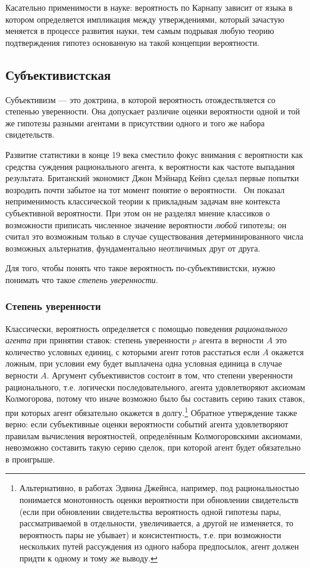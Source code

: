 \documentclass[14pt, a4paper, pdftex]{extarticle}
\begin{document}
Касательно применимости в науке: вероятность по Карнапу зависит от языка в котором определяется импликация между утверждениями, который зачастую меняется в процессе развития науки, тем самым подрывая любую теорию подтверждения гипотез основанную на такой концепции вероятности.

\subsection{Субъективистская}

Субъективизм --- это доктрина, в которой вероятность отождествляется со степенью уверенности. Она допускает различие оценки вероятности одной и той же гипотезы разными агентами в присутствии одного и того же набора свидетельств. 

Развитие статистики в конце 19 века сместило фокус внимания с вероятности как средства суждения рационального агента, к вероятности как частоте выпадания результата. Британский экономист Джон Мэйнард Кейнз сделал первые попытки возродить почти забытое на тот момент понятие о вероятности.~\cite{Keynes} Он показал неприменимость классической теории к прикладным задачам вне контекста субъективной вероятности. При этом он не разделял мнение классиков о возможности приписать численное значение вероятности \emph{любой} гипотезы; он считал это возможным только в случае существования детерминированного числа возможных альтернатив, фундаментально неотличимых друг от друга.~\cite[стр. 5]{Carnap}

Для того, чтобы понять что такое вероятность по-субъективистски, нужно понимать что такое \emph{степень уверенности}.

\subsubsection{Степень уверенности}

Классически, вероятность определяется с помощью поведения \emph{рационального агента} при принятии ставок: степень уверенности $p$ агента в верности $A$ это количество условных единиц, с которыми агент готов расстаться если $A$ окажется ложным, при условии ему будет выплачена одна условная единица в случае верности $A$. Аргумент субъективистов состоит в том, что степени уверенности рационального, т.е. логически последовательного, агента удовлетворяют аксиомам Колмогорова, потому что иначе возможно было бы составить серию таких ставок, при которых агент обязательно окажется в долгу.\footnote{
	Альтернативно, в работах Эдвина Джейнса, например, под рациональностью понимается монотонность оценки вероятности при обновлении свидетельств (если при обновлении свидетельства вероятность одной гипотезы пары, рассматриваемой в отдельности, увеличивается, а другой не изменяется, то вероятность пары не убывает) и консистентность, т.е. при возможности нескольких путей рассуждения из одного набора предпосылок, агент должен придти к одному и тому же выводу.
} 
Обратное утверждение также верно: если субъективные оценки вероятности событий агента удовлетворяют правилам вычисления вероятностей, определённым Колмогоровскими аксиомами, невозможно составить такую серию сделок, при которой агент будет обязательно в проигрыше.
\end{document}
